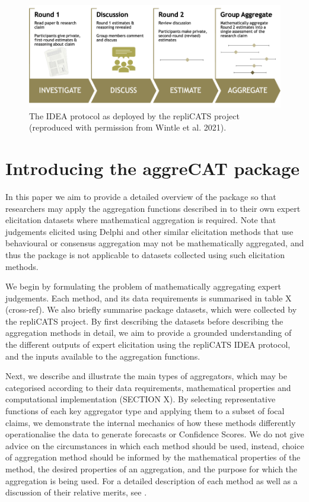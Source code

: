 \documentclass[article]{jss}
\begin{document}
\begin{figure}

{\centering \includegraphics{images/img_IDEA_repliCATS.png}

}

\caption{The IDEA protocol as deployed by the repliCATS project
(reproduced with permission from Wintle et al. 2021).}

\end{figure}

\hypertarget{introducing-the-aggrecat-package}{%
\section{Introducing the aggreCAT
package}\label{introducing-the-aggrecat-package}}

In this paper we aim to provide a detailed overview of the
 package so that researchers may apply the aggregation
functions described in \citep{Hanea2021} to their own expert elicitation
datasets where mathematical aggregation is required. Note that
judgements elicited using Delphi and other similar elicitation methods
that use behavioural or consensus aggregation may not be mathematically
aggregated, and thus the  package is not applicable to
datasets collected using such elicitation methods.

We begin by formulating the problem of mathematically aggregating expert
judgements. Each method, and its data requirements is summarised in
table X (cross-ref). We also briefly summarise package datasets, which
were collected by the repliCATS project. By first describing the
datasets before describing the aggregation methods in detail, we aim to
provide a grounded understanding of the different outputs of expert
elicitation using the repliCATS IDEA protocol, and the inputs available
to the aggregation functions.

Next, we describe and illustrate the main types of aggregators, which
may be categorised according to their data requirements, mathematical
properties and computational implementation (SECTION X). By selecting
representative functions of each key aggregator type and applying them
to a subset of focal claims, we demonstrate the internal mechanics of
how these methods differently operationalise the data to generate
forecasts or Confidence Scores. We do not give advice on the
circumstances in which each method should be used, instead, choice of
aggregation method should be informed by the mathematical properties of
the method, the desired properties of an aggregation, and the purpose
for which the aggregation is being used. For a detailed description of
each method as well as a discussion of their relative merits, see
\citep{Hanea2021}.
\end{document}
